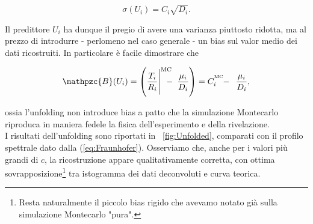\begin{equation}
\sigma(U_i) = C_i \sqrt{D_i}.
\end{equation}

\noindent Il predittore $U_i$ ha dunque il pregio di avere una varianza piuttosto ridotta, ma al prezzo di introdurre - perlomeno nel caso generale - un bias sul valor medio dei dati ricostruiti. In particolare è facile dimostrare che

\begin{equation}
\mathpzc{B}(U_i) = \left(\frac{T_i}{R_i}\Biggl|^{\mathrm{MC}} \!\!\!\!- \enspace\frac{\mu_i}{D_i}\right) = C_i^{^\mathrm{MC}} \!\! - \enspace\frac{\mu_i}{D_i},
\end{equation}

\noindent ossia l'unfolding non introduce bias a patto che la simulazione Montecarlo riproduca in maniera fedele la fisica dell'esperimento e della rivelazione. \\

\noindent I risultati dell'unfolding sono riportati in \figurename~\ref{fig:Unfolded}, comparati con il profilo spettrale dato dalla (\ref{eq:Fraunhofer}). Osserviamo che, anche per i valori più grandi di $c$, la ricostruzione appare qualitativamente corretta, con ottima sovrapposizione\footnote{Resta naturalmente il piccolo bias rigido che avevamo notato già sulla simulazione Montecarlo "pura".} tra istogramma dei dati deconvoluti e curva teorica.

